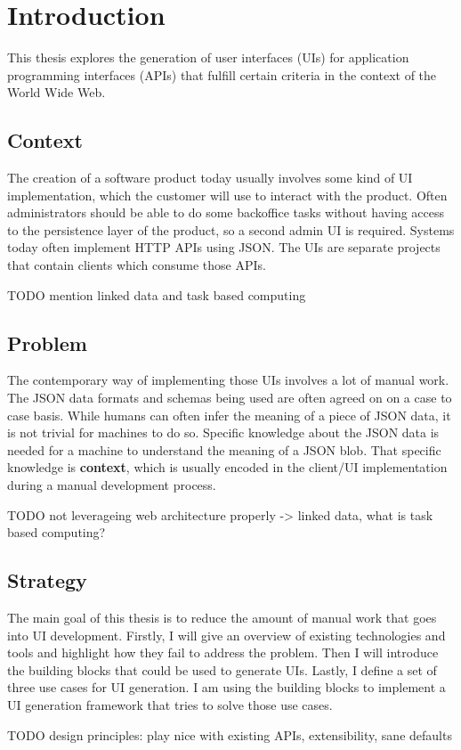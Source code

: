 \section{Introduction}\label{introduction}

This thesis explores the generation of user interfaces (UIs) for application programming interfaces (APIs) that fulfill certain criteria in the context of the World Wide Web.

\subsection{Context}\label{context}
The creation of a software product today usually involves some kind of UI implementation, which the customer will use to interact with the product. Often administrators should be able to do some backoffice tasks without having access to the persistence layer of the product, so a second admin UI is required. Systems today often implement HTTP APIs using JSON. The UIs are separate projects that contain clients which consume those APIs.

TODO mention linked data and task based computing

\subsection{Problem}\label{problem}
The contemporary way of implementing those UIs involves a lot of manual work. The JSON data formats and schemas being used are often agreed on on a case to case basis. While humans can often infer the meaning of a piece of JSON data, it is not trivial for machines to do so. Specific knowledge about the JSON data is needed for a machine to understand the meaning of a JSON blob. That specific knowledge is \textbf{context}, which is usually encoded in the client/UI implementation during a manual development process.

TODO not leverageing web architecture properly -> linked data, what is task based computing?

\subsection{Strategy}\label{strategy}
The main goal of this thesis is to reduce the amount of manual work that goes into UI development. Firstly, I will give an overview of existing technologies and tools and highlight how they fail to address the problem. Then I will introduce the building blocks that could be used to generate UIs. Lastly, I define a set of three use cases for UI generation. I am using the building blocks to implement a UI generation framework that tries to solve those use cases.

TODO design principles: play nice with existing APIs, extensibility, sane defaults
